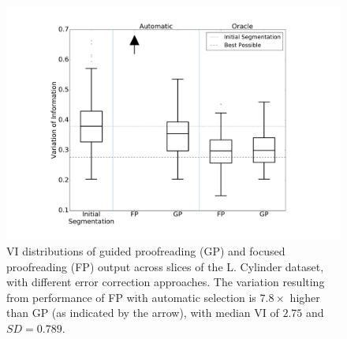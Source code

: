 \begin{figure}[t]
\centering
\includegraphics[width=\linewidth]{gfx/cylboxplot.pdf}
\caption{VI distributions of guided proofreading (GP) and focused proofreading (FP) output across slices of the L. Cylinder dataset, with different error correction approaches. The variation resulting from performance of FP with automatic selection is $7.8\times$ higher than GP (as indicated by the arrow), with median VI of $2.75$ and $SD=0.789$.}
\label{fig:cylboxplot}
\end{figure}


    
    